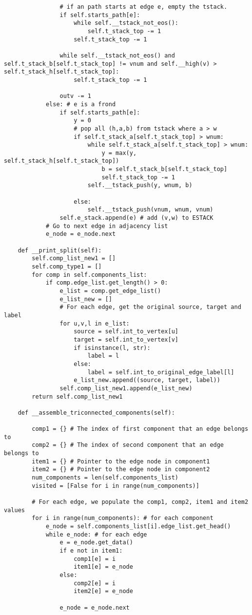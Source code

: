 \begin{verbatim}
				# if an path starts at edge e, empty the tstack.
				if self.starts_path[e]:
					while self.__tstack_not_eos():
						self.t_stack_top -= 1
					self.t_stack_top -= 1

				while self.__tstack_not_eos() and self.t_stack_b[self.t_stack_top] != vnum and self.__high(v) > self.t_stack_h[self.t_stack_top]:
					self.t_stack_top -= 1

				outv -= 1
			else: # e is a frond
				if self.starts_path[e]:
					y = 0
					# pop all (h,a,b) from tstack where a > w
					if self.t_stack_a[self.t_stack_top] > wnum:
						while self.t_stack_a[self.t_stack_top] > wnum:
							y = max(y, self.t_stack_h[self.t_stack_top])
							b = self.t_stack_b[self.t_stack_top]
							self.t_stack_top -= 1
						self.__tstack_push(y, wnum, b)

					else:
						self.__tstack_push(vnum, wnum, vnum)
				self.e_stack.append(e) # add (v,w) to ESTACK
			# Go to next edge in adjacency list
			e_node = e_node.next

	def __print_split(self):
		self.comp_list_new1 = []
		self.comp_type1 = []
		for comp in self.components_list:
			if comp.edge_list.get_length() > 0:
				e_list = comp.get_edge_list()
				e_list_new = []
				# For each edge, get the original source, target and label
				for u,v,l in e_list:
					source = self.int_to_vertex[u]
					target = self.int_to_vertex[v]
					if isinstance(l, str):
						label = l
					else:
						label = self.int_to_original_edge_label[l]
					e_list_new.append((source, target, label))
				self.comp_list_new1.append(e_list_new)
		return self.comp_list_new1

	def __assemble_triconnected_components(self):

		comp1 = {} # The index of first component that an edge belongs to
		comp2 = {} # The index of second component that an edge belongs to
		item1 = {} # Pointer to the edge node in component1
		item2 = {} # Pointer to the edge node in component2
		num_components = len(self.components_list)
		visited = [False for i in range(num_components)]

		# For each edge, we populate the comp1, comp2, item1 and item2 values
		for i in range(num_components): # for each component
			e_node = self.components_list[i].edge_list.get_head()
			while e_node: # for each edge
				e = e_node.get_data()
				if e not in item1:
					comp1[e] = i
					item1[e] = e_node
				else:
					comp2[e] = i
					item2[e] = e_node

				e_node = e_node.next


\end{verbatim}
